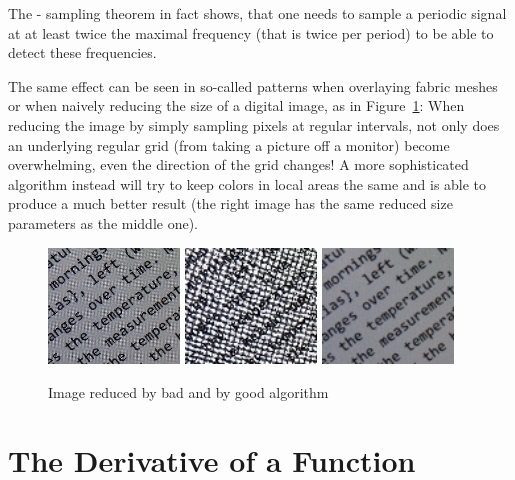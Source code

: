 The - sampling theorem in fact shows, that
one needs to sample a periodic signal at at least twice the maximal
frequency (that is twice per period) to be able to detect these frequencies.


The same effect can be seen in so-called  patterns when
overlaying fabric meshes or when naively reducing the size of a digital
image, as in Figure~\ref{figscreenpic}: When reducing the image by simply
sampling pixels at regular intervals, not only does an underlying regular
grid (from taking a picture off a monitor) become overwhelming, even the
direction of the grid changes! A more sophisticated algorithm instead will
try to keep colors in local areas the same and is able to produce a much
better result (the right image has the same reduced size parameters as the
middle one).
\begin{figure}
\begin{center}
\includegraphics[width=35mm]{pic/screenphoto.png}
\quad
\includegraphics[width=35mm]{pic/screenphoto2.png}
\quad
\includegraphics[width=35mm]{pic/screenphoto3.png}
\end{center}
\caption{Image reduced by bad and by good algorithm}
\label{figscreenpic}
\end{figure}

\section{The Derivative of a Function}

